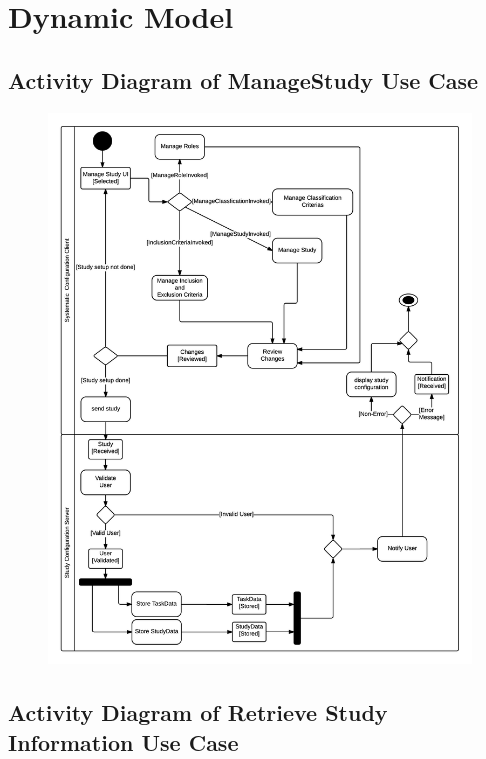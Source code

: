 \section{Dynamic Model}
\subsection{Activity Diagram of ManageStudy Use Case}
\begin{figure}[H]
  \includegraphics[width=45em]{section/DynamicModel/Activity_Diagram_Manage_Study}
  \label{fig: Activity Diagram of ManageStudy Use Case}
\end{figure}

\subsection{ Activity Diagram of Retrieve Study Information Use Case}
\begin{figure}[H]
  \label{fig: Activity Diagram of Retrieve Study Information Use Case}
\end{figure}

